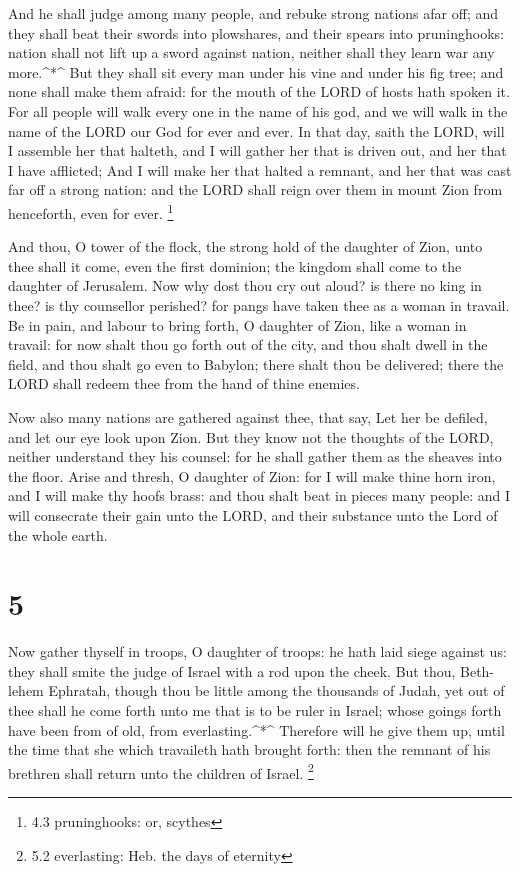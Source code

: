  And he shall judge among many people, and rebuke strong
nations afar off; and they shall beat their swords into plowshares, and
their spears into pruninghooks: nation shall not lift up a sword against
nation, neither shall they learn war any more.\^{}*\^{}  But
they shall sit every man under his vine and under his fig tree; and none
shall make them afraid: for the mouth of the LORD of hosts hath spoken
it.  For all people will walk every one in the name of his
god, and we will walk in the name of the LORD our God for ever and ever.
 In that day, saith the LORD, will I assemble her that
halteth, and I will gather her that is driven out, and her that I have
afflicted;  And I will make her that halted a remnant, and
her that was cast far off a strong nation: and the LORD shall reign over
them in mount Zion from henceforth, even for ever. \footnote{4.3
  pruninghooks: or, scythes}

 And thou, O tower of the flock, the strong hold of the
daughter of Zion, unto thee shall it come, even the first dominion; the
kingdom shall come to the daughter of Jerusalem.  Now why
dost thou cry out aloud? is there no king in thee? is thy counsellor
perished? for pangs have taken thee as a woman in travail. 
Be in pain, and labour to bring forth, O daughter of Zion, like a woman
in travail: for now shalt thou go forth out of the city, and thou shalt
dwell in the field, and thou shalt go even to Babylon; there shalt thou
be delivered; there the LORD shall redeem thee from the hand of thine
enemies.

 Now also many nations are gathered against thee, that say,
Let her be defiled, and let our eye look upon Zion.  But
they know not the thoughts of the LORD, neither understand they his
counsel: for he shall gather them as the sheaves into the floor.
 Arise and thresh, O daughter of Zion: for I will make
thine horn iron, and I will make thy hoofs brass: and thou shalt beat in
pieces many people: and I will consecrate their gain unto the LORD, and
their substance unto the Lord of the whole earth.

\hypertarget{section-4}{%
\section{5}\label{section-4}}

 Now gather thyself in troops, O daughter of troops: he hath
laid siege against us: they shall smite the judge of Israel with a rod
upon the cheek.  But thou, Beth-lehem Ephratah, though thou
be little among the thousands of Judah, yet out of thee shall he come
forth unto me that is to be ruler in Israel; whose goings forth have
been from of old, from everlasting.\^{}*\^{}  Therefore will
he give them up, until the time that she which travaileth hath brought
forth: then the remnant of his brethren shall return unto the children
of Israel. \footnote{5.2 everlasting: Heb. the days of eternity}

